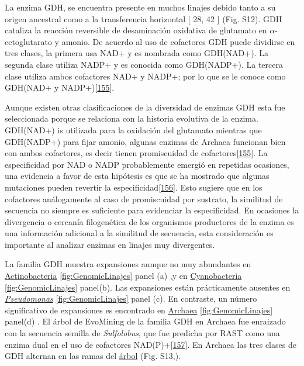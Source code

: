 \documentclass[12pt,twoside]{reedthesis}
\begin{document}
  La enzima GDH, se encuentra presente en muchos linajes debido tanto a su
  origen ancestral como a la transferencia horizontal {[} 28, 42 {]} (Fig.
  S12). GDH cataliza la reacción reversible de desaminación oxidativa de
  glutamato en \(\alpha\)-cetoglutarato y amonio. De acuerdo al uso de
  cofactores GDH puede dividirse en tres clases, la primera usa NAD+ y es
  nombrada como GDH(NAD+). La segunda clase utiliza NADP+ y es conocida
  como GDH(NADP+). La tercera clase utiliza ambos cofactores NAD+ y NADP+;
  por lo que se le conoce como GDH(NAD+ y
  NADP+){[}\protect\hyperlink{ref-engel_glutamate_2014}{155}{]}.
  
  Aunque existen otras clasificaciones de la diversidad de enzimas GDH
  esta fue seleccionada porque se relaciona con la historia evolutiva de
  la enzima. GDH(NAD+) is utilizada para la oxidación del glutamato
  mientras que GDH(NADP+) para fijar amonio, algunas enzimas de Archaea
  funcionan bien con ambos cofactores, es decir tienen promiscuidad de
  cofactores{[}\protect\hyperlink{ref-engel_glutamate_2014}{155}{]}. La
  especificidad por NAD o NADP probablemente emergió en repetidas
  ocasiones, una evidencia a favor de esta hipótesis es que se ha mostrado
  que algunas mutaciones pueden revertir la
  especificidad{[}\protect\hyperlink{ref-lilley_partial_1991}{156}{]}.
  Esto sugiere que en los cofactores análogamente al caso de promiscuidad
  por sustrato, la similitud de secuencia no siempre es suficiente para
  evidenciar la especificidad. En ocasiones la divergencia o cercanía
  filogenética de los organismos productores de la enzima es una
  información adicional a la similitud de secuencia, esta consideración es
  importante al analizar enzimas en linajes muy divergentes.
  
  La familia GDH muestra expansiones aunque no muy abundantes en
  \href{https://microreact.org/project/r1IhjVm6X?tt=cr}{Actinobacteria}
  \autoref{fig:GenomicLinajes} panel (a) ,y en
  \href{https://microreact.org/project/HyjYUN7pQ?tt=cr}{Cyanobacteria}
  \autoref{fig:GenomicLinajes} panel(b). Las expansiones están
  prácticamente ausentes en
  \href{https://microreact.org/project/HyjYUN7pQ?tt=cr}{\emph{Pseudomonas}}
  \autoref{fig:GenomicLinajes} panel (c). En contraste, un número
  significativo de expansiones es encontrado en
  \href{https://microreact.org/project/ByUcvNmaX?tt=cr}{Archaea}
  \autoref{fig:GenomicLinajes} panel(d) . El árbol de EvoMining de la
  familia GDH en Archaea fue enraizado con la secuencia semilla de
  \emph{Sulfolobus}, que fue predicha por RAST como una enzima dual en el
  uso de cofactores
  NAD(P)+{[}\protect\hyperlink{ref-consalvi_glutamate_1991}{157}{]}. En
  Archaea las tres clases de GDH alternan en las ramas del
  \href{https://microreact.org/project/ByUcvNmaX?tt=cr}{árbol} (Fig.
  S13,).
  
\end{document}
